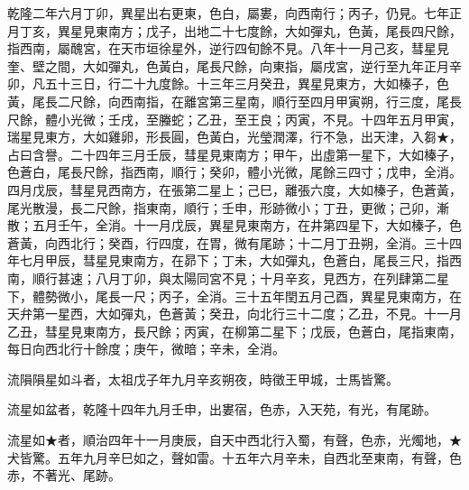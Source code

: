 \begin{pinyinscope}
乾隆二年六月丁卯，異星出右更東，色白，屬婁，向西南行；丙子，仍見。七年正月丁亥，異星見東南方；戊子，出地二十七度餘，大如彈丸，色黃，尾長四尺餘，指西南，屬醜宮，在天市垣徐星外，逆行四旬餘不見。八年十一月己亥，彗星見奎、壁之間，大如彈丸，色黃白，尾長尺餘，向東指，屬戌宮，逆行至九年正月辛卯，凡五十三日，行二十九度餘。十三年三月癸丑，異星見東方，大如榛子，色黃，尾長二尺餘，向西南指，在離宮第三星南，順行至四月甲寅朔，行三度，尾長尺餘，體小光微；壬戌，至螣蛇；乙丑，至王良；丙寅，不見。十四年五月甲寅，瑞星見東方，大如雞卵，形長圓，色黃白，光瑩潤澤，行不急，出天津，入芻★，占曰含譽。二十四年三月壬辰，彗星見東南方；甲午，出虛第一星下，大如榛子，色蒼白，尾長尺餘，指西南，順行；癸卯，體小光微，尾餘三四寸；戊申，全消。四月戊辰，彗星見西南方，在張第二星上；己巳，離張六度，大如榛子，色蒼黃，尾光散漫，長二尺餘，指東南，順行；壬申，形跡微小；丁丑，更微；己卯，漸散；五月壬午，全消。十一月戊辰，異星見東南方，在井第四星下，大如榛子，色蒼黃，向西北行；癸酉，行四度，在胃，微有尾跡；十二月丁丑朔，全消。三十四年七月甲辰，彗星見東南方，在昴下；丁未，大如彈丸，色蒼白，尾長三尺，指西南，順行甚速；八月丁卯，與太陽同宮不見；十月辛亥，見西方，在列肆第二星下，體勢微小，尾長一尺；丙子，全消。三十五年閏五月己酉，異星見東南方，在天弁第一星西，大如彈丸，色蒼黃；癸丑，向北行三十二度；乙丑，不見。十一月乙丑，彗星見東南方，長尺餘；丙寅，在柳第二星下；戊辰，色蒼白，尾指東南，每日向西北行十餘度；庚午，微暗；辛未，全消。

流隕隕星如斗者，太祖戊子年九月辛亥朔夜，時徵王甲城，士馬皆驚。

流星如盆者，乾隆十四年九月壬申，出婁宿，色赤，入天苑，有光，有尾跡。

流星如★者，順治四年十一月庚辰，自天中西北行入蜀，有聲，色赤，光燭地，★犬皆驚。五年九月辛巳如之，聲如雷。十五年六月辛未，自西北至東南，有聲，色赤，不著光、尾跡。


\end{pinyinscope}

